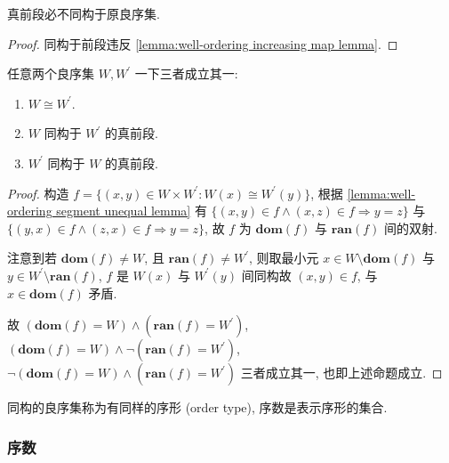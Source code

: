 \begin{lemma}
    \label{lemma:well-ordering segment unequal lemma}
    真前段必不同构于原良序集.

    \begin{proof}
        同构于前段违反 \ref{lemma:well-ordering increasing map lemma}.
    \end{proof}
\end{lemma}

\begin{theorem}
    \label{theorem:well-ordering segment equal theorem}
    任意两个良序集 \(W, W^\prime\) 一下三者成立其一:
    \begin{enumerate}
        \item \(W \cong W^\prime\).
        \item \(W\) 同构于 \(W^\prime\) 的真前段.
        \item \(W^\prime\) 同构于 \(W\) 的真前段.
    \end{enumerate}

    \begin{proof}
        构造 \(f = \{(x,y) \in W \times W^\prime : W(x) \cong W^\prime(y)\}\),
        根据 \ref{lemma:well-ordering segment unequal lemma} 有 \(\{(x,y) \in f \land (x,z) \in f \Rightarrow y = z\}\) 与
        \(\{(y,x) \in f \land (z,x) \in f \Rightarrow y=z\}\), 
        故 \(f\) 为 \(\mathbf{dom} (f)\) 与 \(\mathbf{ran} (f)\) 间的双射.

        注意到若 \(\mathbf{dom} (f) \neq W\), 且 \(\mathbf{ran} (f) \neq W^\prime\),
        则取最小元 \(x \in W \setminus \mathbf{dom} (f)\) 与 \(y \in W^\prime \setminus \mathbf{ran} (f)\),
        \(f\) 是 \(W(x)\) 与 \(W^\prime(y)\) 间同构故 \((x,y) \in f\), 与 \(x \in \mathbf{dom} (f)\) 矛盾.

        故 \((\mathbf{dom} (f) = W) \land (\mathbf{ran} (f) = W^\prime)\), \((\mathbf{dom} (f) = W) \land \neg(\mathbf{ran} (f) = W^\prime)\), 
        \(\neg(\mathbf{dom} (f) = W) \land (\mathbf{ran} (f) = W^\prime)\) 三者成立其一, 也即上述命题成立.
    \end{proof}
\end{theorem}

\begin{definition}
    同构的良序集称为有同样的序形 (order type), 序数是表示序形的集合.
\end{definition}

\subsubsection{序数}

